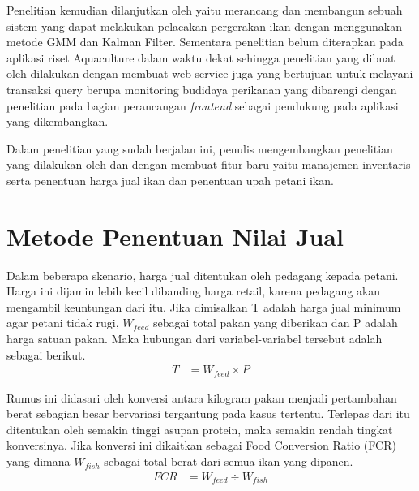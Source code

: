 Penelitian \citep{bagus2022} kemudian dilanjutkan oleh \citep{hafiz2021} yaitu merancang dan membangun sebuah sistem yang dapat melakukan pelacakan pergerakan ikan dengan menggunakan metode GMM dan Kalman Filter. Sementara penelitian \citep{fadhil2021} belum diterapkan pada aplikasi riset Aquaculture dalam waktu dekat sehingga penelitian yang dibuat oleh \citep{andri2022} dilakukan dengan membuat web service juga yang bertujuan untuk melayani transaksi query berupa monitoring budidaya perikanan yang dibarengi dengan penelitian \citep{gian2022} pada bagian perancangan \textit{frontend} sebagai pendukung pada aplikasi yang dikembangkan.

Dalam penelitian yang sudah berjalan ini, penulis mengembangkan penelitian yang dilakukan oleh \citep{andri2022} dan \citep{gian2022} dengan membuat fitur baru yaitu manajemen inventaris serta penentuan harga jual ikan dan penentuan upah petani ikan.

\section{Metode Penentuan Nilai Jual}

Dalam beberapa skenario, harga jual ditentukan oleh pedagang kepada petani. Harga ini dijamin lebih kecil dibanding harga retail, karena pedagang akan mengambil keuntungan dari itu. Jika dimisalkan T adalah harga jual minimum agar petani tidak rugi, $W_{feed}$ sebagai total pakan yang diberikan dan P adalah harga satuan pakan. Maka hubungan dari variabel-variabel tersebut adalah sebagai berikut.
\begin{equation}
    \begin{split}
		T
		&= W_{feed} \times P
    \end{split}
\end{equation}

Rumus ini didasari oleh konversi antara kilogram pakan menjadi pertambahan berat sebagian besar bervariasi tergantung pada kasus tertentu. Terlepas dari itu ditentukan oleh semakin tinggi asupan protein, maka semakin rendah tingkat konversinya. Jika konversi ini dikaitkan sebagai Food Conversion Ratio  (FCR) yang dimana $W_{fish}$ sebagai total berat dari semua ikan yang dipanen.
\begin{equation}
    \begin{split}
		FCR
		&= W_{feed } \div W_{fish}
    \end{split}
\end{equation}

